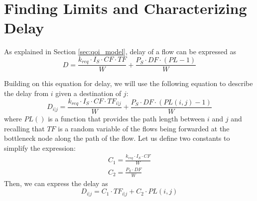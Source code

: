 \section{Finding Limits and Characterizing Delay}
\label{sec:delay_char}

%

As explained in Section \ref{sec:qoi_model}, delay of a flow can be expressed as
\begin{equation}
	D = \frac{ k_{req} \cdot I_S \cdot CF \cdot TF}{W} + \frac{P_S \cdot DF \cdot (PL-1)}{W}
\end{equation}

Building on this equation for delay, we will use the following equation to describe the delay from $i$ given a destination of $j$:
\begin{equation}
	D_{i | j} = \frac{ k_{req} \cdot I_S \cdot CF \cdot TF_{i | j}}{W} + \frac{P_S \cdot DF \cdot (PL(i,j)-1)}{W}
\end{equation}
where $PL()$ is a function that provides the path length between $i$ and $j$ and recalling that $TF$ is a random variable of the flows being forwarded at the bottleneck node along the path of the flow.  Let us define two constants to simplify the expression:
\begin{eqnarray*}
	C_1 = \frac{k_{req} \cdot I_S \cdot CF}{W} \\
	C_2 = \frac{P_S \cdot DF}{W}
\end{eqnarray*}
Then, we can express the delay as
\begin{equation}
	D_{i | j} = C_1 \cdot TF_{i | j} + C_2 \cdot PL(i,j)
\end{equation}


